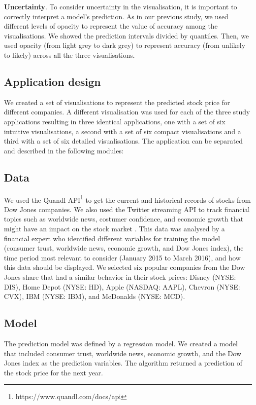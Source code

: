 \documentclass[final,5p,times,twocolumn,authoryear]{elsarticle}
\begin{document}
\textbf{Uncertainty}. To consider uncertainty in the visualisation, it is important to correctly interpret a model's prediction. As in our previous study, we used different levels of opacity to represent the value of accuracy among the visualisations. We showed the prediction intervals divided by quantiles. Then, we used opacity (from light grey to dark grey) to represent accuracy (from unlikely to likely) across all the three visualisations.

\subsection{Application design}
We created a set of visualisations to represent the predicted stock price for different companies. A different visualisation was used for each of the three study applications resulting in three identical applications, one with a set of six intuitive visualisations, a second with a set of six compact visualisations and a third with a set of six detailed visualisations. The application can be separated and described in the following modules: 

\subsection{Data}
We used the Quandl API\footnote{https://www.quandl.com/docs/api} to get the current and historical records of stocks from Dow Jones companies. We also used the Twitter streaming API to track financial topics such as worldwide news, costumer confidence, and economic growth that might have an impact on the stock market \citep{Bollen2011}. This data was analysed by a financial expert who identified different variables for training the model (consumer trust, worldwide news, economic growth, and Dow Jones index), the time period most relevant to consider (January 2015 to March 2016), and how this data should be displayed. We selected six popular companies from the Dow Jones share that had a similar behavior in their stock prices: Disney (NYSE: DIS), Home Depot (NYSE: HD), Apple (NASDAQ: AAPL), Chevron (NYSE: CVX), IBM (NYSE: IBM), and McDonalds (NYSE: MCD). 

\subsection{Model}
The prediction model was defined by a regression model. We created a model that included consumer trust, worldwide news, economic growth, and the Dow Jones index as the prediction variables. The algorithm returned a prediction of the stock price for the next year.
\end{document}
